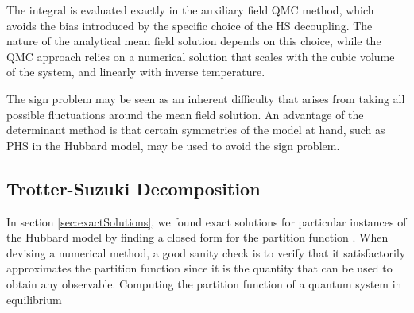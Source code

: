 The integral is evaluated exactly in the auxiliary field \ac{QMC} method, which avoids the bias introduced by the specific choice of the HS decoupling.
The nature of the analytical mean field solution depends on this choice, while the \ac{QMC} approach relies on a numerical solution that scales with the cubic volume of the system, and linearly with inverse temperature.

The sign problem may be seen as an inherent difficulty that arises from taking all possible fluctuations around the mean field solution.
An advantage of the determinant method is that certain symmetries of the model at hand, such as \ac{PHS} in the Hubbard model, may be used to avoid the sign problem.

\subsection{Trotter-Suzuki Decomposition}
\label{subsec:trotter}

In section \ref{sec:exactSolutions}, we found exact solutions for particular instances of the Hubbard model by finding a closed form for the partition function \cite{hou_numerical_2009}. When devising a numerical method, a good sanity check is to verify that it satisfactorily approximates the partition function since it is the quantity that can be used to obtain  any observable.
Computing the partition function of a quantum system in equilibrium

